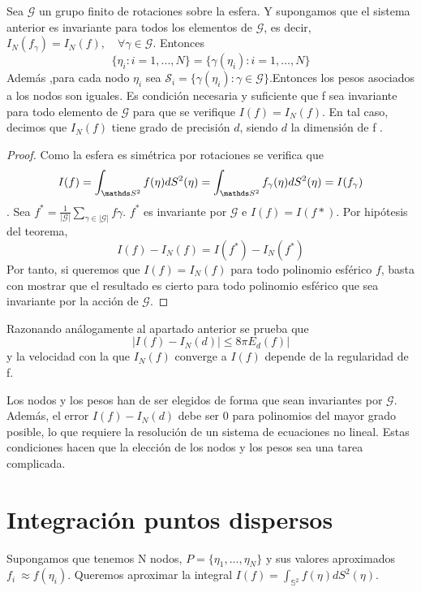 \begin{thm}Sea $\mathcal{G}$ un grupo finito de rotaciones sobre la esfera. Y supongamos que el sistema anterior es invariante para todos los elementos de $\mathcal{G}$, es decir, $I_N(f_\gamma)=I_N(f), \quad \forall \gamma \in \mathcal{G}$. Entonces $$\{\eta_i:i=1,...,N\}=\{\gamma(\eta_i):i=1,...,N\}$$ Además ,para cada nodo $\eta_i$ sea $\mathcal{S}_i=\{\gamma(\eta_i):\gamma \in \mathcal{G}\}$.Entonces los pesos asociados a los nodos son iguales. Es condición necesaria y suficiente que f sea invariante para todo elemento de $\mathcal{G}$ para que  se verifique $I(f)=I_N(f)$. En tal caso, decimos que $I_N(f)$ tiene grado de precisión $d$, siendo $d$ la dimensión de f .

\end{thm}
\begin{proof}
Como la esfera es simétrica por rotaciones se verifica que $$I(f) = \int_{\esfera} f(\eta)dS^2(\eta) = \int_{\esfera} f_\gamma(\eta)dS^2(\eta) = I(f_\gamma)$$.
Sea $f^* = \frac{1}{|\mathcal{G}|} \sum_{\gamma \in |\mathcal{G}| } f\gamma$. $f^*$ es invariante por $\mathcal{G}$ e $I(f) = I(f*)$. Por hipótesis del teorema, $$
I(f)-I_N(f) = I(f^*) - I_N(f^*) $$
Por tanto, si queremos que $I(f)=I_N(f)$ para todo polinomio esférico $f$, basta con mostrar que el resultado es cierto para todo polinomio esférico que sea invariante por la acción de  $\mathcal{G}$.
\end{proof}
Razonando análogamente al apartado anterior se prueba que
$$
|I(f)-I_N(d)| \le 8\pi E_d(f)|
$$
y la velocidad con la que $I_N(f)$ converge a $I(f)$ depende de la regularidad de f.
\medskip

Los nodos y los pesos han de ser elegidos de forma que sean invariantes por $\mathcal{G}$. Además, el error $I(f)-I_N(d)$ debe ser 0 para polinomios del mayor grado posible, lo que requiere la resolución de un sistema de ecuaciones no lineal. Estas condiciones hacen que la elección de los nodos y los pesos sea una tarea complicada.

\section{Integración puntos dispersos}
Supongamos que tenemos N nodos, $P=\{\eta_1,...,\eta_N\}$ y sus valores aproximados $f_i~\approx f(\eta_i)$. Queremos aproximar la integral $I(f) =  \int_{\mathds{S}^2} f(\eta)dS^2(\eta)$.

